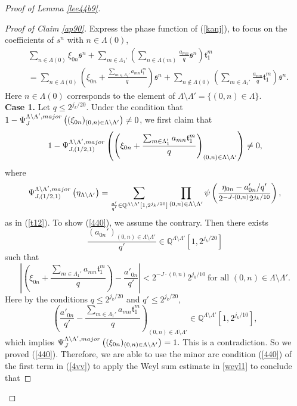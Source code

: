 \documentclass[10pt,a4paper]{amsart}
\numberwithin{equation}{section}
\begin{document}
\begin{proof}[Proof of Lemma \ref{lee44b9}]
\begin{proof}[Proof of Claim \ref{ap90}]
   Express the phase function of (\ref{kanj}),  to focus on the coefficients of $s^n$ with $n\in \Lambda(0)$,
	\begin{align}\label{4vv}
		& \sum_{n\in \Lambda(0)} \xi_{0n}\mathfrak{s}^n+ \sum_{m\in \Lambda_1'}\left(\sum_{n\in \Lambda(m)} \frac{a_{mn}}{q}\mathfrak{s}^n\right)\mathfrak{t}_1^{m}  \nonumber \\
		&=\sum_{n\in \Lambda(0)} \left( \xi_{0n}+ \frac{\sum_{m\in \Lambda_1'} a_{mn}\mathfrak{t}_1^{m}}{q} \right)\mathfrak{s}^{n}+ \sum_{n\notin  \Lambda(0)} \left(\sum_{m\in \Lambda_1'}\frac{a_{mn}}{q}\mathfrak{t}_1^{m}  \right)\mathfrak{s}^n. 
	\end{align}
	Here  $n\in \Lambda(0)$ corresponds to the element of $\Lambda\setminus \Lambda'=\{(0,n)\in\Lambda\}$.\\
\textbf{	Case 1.} Let  $q\le 2^{ j_k/20}$.  Under the  condition  that  $1-\Psi_J^{\Lambda\setminus \Lambda',\rm{major}}\left( (\xi_{0n})_{(0,n)\in\Lambda\setminus\Lambda'} \right)\neq 0$, we first claim  that
\begin{align}\label{440}
1- \Psi_{J,(1/2,1)}^{\Lambda\setminus \Lambda',\rm{major}}\left(\left(\xi_{0n}+ \frac{\sum_{m\in \Lambda_1'} a_{mn}\mathfrak{t}_1^{m}}{q}\right)_{(0,n)\in \Lambda\setminus \Lambda'}\right)\neq 0,
\end{align}
where 
$$\Psi_{J,(1/2,1)}^{\Lambda\setminus \Lambda',\rm{major}}\left(  \eta_{\Lambda\setminus\Lambda'}  \right)=\sum_{\frac{a'}{q'} \in  \mathbb{Q}^{\Lambda\setminus\Lambda'}[1,2^{j_k/20}]}\prod_{(0,n)\in\Lambda\setminus \Lambda'} \psi\left(  \frac{ \eta_{0n}-a'_{0n}/q'}{  2^{-J\cdot (0,n)}2^{j_k /10}} \right),$$ as in (\ref{t12}).
To show (\ref{440}), we 
assume the contrary. Then there exists $$ \frac{(a_{0n}')_{(0,n)\in \Lambda\setminus\Lambda'}}{q'}\in  \mathbb{Q}^{\Lambda\setminus\Lambda'}[1,2^{j_k/20}] $$
such that
$$\left| \left(\xi_{0n}+ \frac{\sum_{m\in \Lambda_1'} a_{mn}\mathfrak{t}_1^{m}}{q}\right)- \frac{a'_{0n}}{q'}\right|< 2^{-J\cdot (0,n)} 2^{j_k/10}\ \text{for all $(0,n)\in \Lambda\setminus \Lambda'$}.$$
Here by the conditions $q\le 2^{j_k/20}$ and $q'\le 2^{j_k/20}$,
$$ \left( \frac{a'_{0n}}{q'}- \frac{\sum_{m\in \Lambda_1'} a_{mn}\mathfrak{t}_1^{m}}{q}\right)_{(0,n)\in \Lambda\setminus\Lambda'}\in \mathbb{Q}^{\Lambda\setminus\Lambda'}[1,2^{j_k/10}], $$
which implies $\Psi_J^{\Lambda\setminus \Lambda',\rm{major}}\left( (\xi_{0n})_{(0,n)\in\Lambda\setminus\Lambda'} \right)=1.$ This is a contradiction.  So we proved (\ref{440}).
Therefore, we are able to use the minor arc condition (\ref{440}) of the first term in (\ref{4vv})   to apply the Weyl sum estimate  in \eqref{weyl1}  to conclude that  

\end{proof}
\end{proof}
\end{document}
